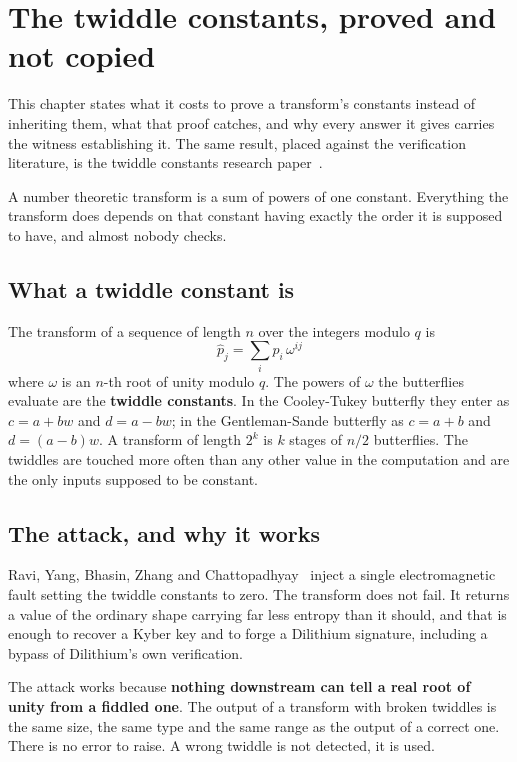 \chapter{The twiddle constants, proved and not copied}

This chapter states what it costs to prove a transform's constants instead of inheriting them, what that proof catches, and why every answer it gives carries the witness establishing it. The same result, placed against the verification literature, is the twiddle constants research paper~\cite{src:Quigg-twiddle-constants}.

A number theoretic transform is a sum of powers of one constant. Everything the transform does depends on that constant having exactly the order it is supposed to have, and almost nobody checks.

\section{What a twiddle constant is}

The transform of a sequence of length \(n\) over the integers modulo \(q\) is
\[
\hat{p}_j = \sum_i p_i \, \omega^{ij}
\]
where \(\omega\) is an \(n\)-th root of unity modulo \(q\). The powers of \(\omega\) the butterflies evaluate are the \textbf{twiddle constants}. In the Cooley-Tukey butterfly they enter as \(c = a + bw\) and \(d = a - bw\); in the Gentleman-Sande butterfly as \(c = a + b\) and \(d = (a-b)w\). A transform of length \(2^k\) is \(k\) stages of \(n/2\) butterflies. The twiddles are touched more often than any other value in the computation and are the only inputs supposed to be constant.

\section{The attack, and why it works}

Ravi, Yang, Bhasin, Zhang and Chattopadhyay~\cite{src:Ravi} inject a single electromagnetic fault setting the twiddle constants to zero. The transform does not fail. It returns a value of the ordinary shape carrying far less entropy than it should, and that is enough to recover a Kyber key and to forge a Dilithium signature, including a bypass of Dilithium's own verification.

The attack works because \textbf{nothing downstream can tell a real root of unity from a fiddled one}. The output of a transform with broken twiddles is the same size, the same type and the same range as the output of a correct one. There is no error to raise. A wrong twiddle is not detected, it is used.


